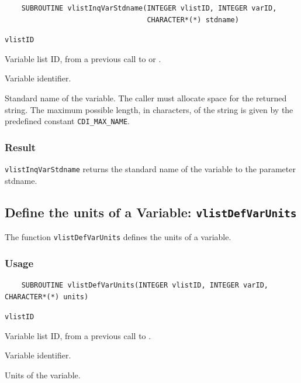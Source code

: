 \begin{verbatim}
    SUBROUTINE vlistInqVarStdname(INTEGER vlistID, INTEGER varID, 
                                  CHARACTER*(*) stdname)
\end{verbatim}

\hspace*{4mm}\begin{minipage}[]{15cm}
\begin{deflist}{\texttt{vlistID}\ }
\item[\texttt{vlistID}]
Variable list ID, from a previous call to {} or {}.
\item[\texttt{varID}]
Variable identifier.
\item[\texttt{stdname}]
Standard name of the variable. The caller must allocate space for the
                    returned string. The maximum possible length, in characters, of
                    the string is given by the predefined constant {\texttt{CDI\_MAX\_NAME}}.

\end{deflist}
\end{minipage}

\subsubsection*{Result}

{\texttt{vlistInqVarStdname}} returns the standard name of the variable to the parameter stdname.



\subsection{Define the units of a Variable: \texttt{vlistDefVarUnits}}
\label{vlistDefVarUnits}

The function {\texttt{vlistDefVarUnits}} defines the units of a variable.

\subsubsection*{Usage}

\begin{verbatim}
    SUBROUTINE vlistDefVarUnits(INTEGER vlistID, INTEGER varID, CHARACTER*(*) units)
\end{verbatim}

\hspace*{4mm}\begin{minipage}[]{15cm}
\begin{deflist}{\texttt{vlistID}\ }
\item[\texttt{vlistID}]
Variable list ID, from a previous call to {}.
\item[\texttt{varID}]
Variable identifier.
\item[\texttt{units}]
Units of the variable.

\end{deflist}
\end{minipage}


